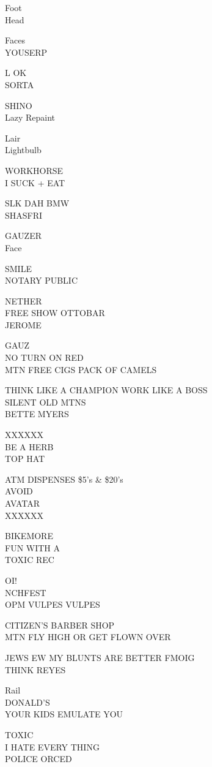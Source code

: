 \documentclass[10pt,letterpaper]{article}
\begin{document}
Foot\\
Head

Faces\\
YOUSERP

L OK\\
SORTA

SHINO\\
Lazy Repaint

Lair\\
Lightbulb

WORKHORSE\\
I SUCK + EAT

SLK DAH BMW\\
SHASFRI

GAUZER\\
Face

SMILE\\
NOTARY PUBLIC

NETHER\\
FREE SHOW OTTOBAR\\
JEROME

GAUZ\\
NO TURN ON RED\\
MTN FREE CIGS PACK OF CAMELS

THINK LIKE A CHAMPION WORK LIKE A BOSS\\
SILENT OLD MTNS\\
BETTE MYERS

XXXXXX\\
BE A HERB\\
TOP HAT

ATM DISPENSES \$5's \& \$20's\\
AVOID\\
AVATAR\\
XXXXXX

BIKEMORE\\
FUN WITH A\\
TOXIC REC

OI!\\
NCHFEST\\
OPM VULPES VULPES

CITIZEN'S BARBER SHOP\\
MTN FLY HIGH OR GET FLOWN OVER

JEWS EW MY BLUNTS ARE BETTER FMOIG\\
THINK REYES

Rail\\
DONALD'S\\
YOUR KIDS EMULATE YOU

TOXIC\\
I HATE EVERY THING\\
POLICE ORCED
\end{document}
